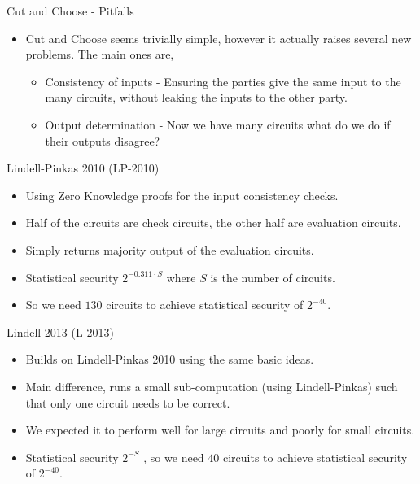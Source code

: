 \documentclass[t, 12pt]{beamer}            %
\begin{document}
\begin{frame}{Cut and Choose - Pitfalls}
	\begin{itemize} %
		\item Cut and Choose seems trivially simple, however it actually raises several new problems. The main ones are,
		\begin{itemize}
			\item Consistency of inputs - Ensuring the parties give the same input to the many circuits, without leaking the inputs to the other party.
			\item Output determination - Now we have many circuits what do we do if their outputs disagree?
		\end{itemize}
	\end{itemize}

\end{frame}


\begin{frame}{Lindell-Pinkas 2010 (LP-2010)}
	\begin{itemize} %
		\item Using Zero Knowledge proofs for the input consistency checks.
		\item Half of the circuits are check circuits, the other half are evaluation circuits.
		\item Simply returns majority output of the evaluation circuits.
		\item Statistical security $2^{-0.311 \cdot S}$  where $S$ is the number of circuits.
		\item So we need $130$ circuits to achieve statistical security of $2^{-40}$.
	\end{itemize}

\end{frame}


\begin{frame}{Lindell 2013 (L-2013)}
	\begin{itemize} %
		\item Builds on Lindell-Pinkas 2010 using the same basic ideas.  %
		\item Main difference, runs a small sub-computation (using Lindell-Pinkas) such that only one circuit needs to be correct.
		\item We expected it to perform well for large circuits and poorly for small circuits.
		\item Statistical security $2^{-S}$ , so we need $40$ circuits to achieve statistical security of $2^{-40}$.
	\end{itemize}

\end{frame}
\end{document}
